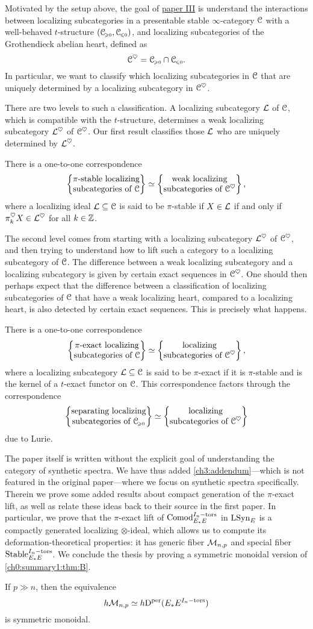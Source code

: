 Motivated by the setup above, the goal of \hyperref[ch3]{paper III} is understand the interactions between localizing subcategories in a presentable stable $\infty$-category $\EuScript{C}$ with a well-behaved $t$-structure $(\EuScript{C}_{\hspace{-1pt}\scriptscriptstyle\geqslant 0}, \EuScript{C}_{\hspace{-1pt}\scriptscriptstyle\leqslant 0})$, and localizing subcategories of the Grothendieck abelian heart, defined as 
\[\EuScript{C}^\heartsuit = \EuScript{C}_{\hspace{-1pt}\scriptscriptstyle\geqslant 0}\cap \EuScript{C}_{\hspace{-1pt}\scriptscriptstyle\leqslant 0}.\] 
In particular, we want to classify which localizing subcategories in $\EuScript{C}$ that are uniquely determined by a localizing subcategory in $\EuScript{C}^\heartsuit$. 

There are two levels to such a classification. A localizing subcategory $\mathcal{L}$ of $\EuScript{C}$, which is compatible with the $t$-structure, determines a weak localizing subcategory $\mathcal{L}^\heartsuit$ of $\EuScript{C}^\heartsuit$. Our first result classifies those $\mathcal{L}$ who are uniquely determined by $\mathcal{L}^\heartsuit$. 

\begin{theorem}
    There is a one-to-one correspondence
    \[\left\{ \begin{matrix} \pi\text{-stable localizing}\\ \text{subcategories of }\EuScript{C} \end{matrix} \right\} \simeq \left\{ \begin{matrix} \text{weak localizing}\\ \text{subcategories of }\EuScript{C}^\heartsuit \end{matrix} \right\},\]
    where a localizing ideal $\mathcal{L}\subseteq \EuScript{C}$ is said to be $\pi$-stable if $X\in \mathcal{L}$ if and only if $\pi_k^\heartsuit X \in \mathcal{L}^\heartsuit$ for all $k\in \mathbb{Z}$.  
\end{theorem}

The second level comes from starting with a localizing subcategory $\mathcal{L}^\heartsuit$ of $\EuScript{C}^\heartsuit$, and then trying to understand how to lift such a category to a localizing subcategory of $\EuScript{C}$. The difference between a weak localizing subcategory and a localizing subcategory is given by certain exact sequences in $\EuScript{C}^\heartsuit$. One should then perhaps expect that the difference between a classification of localizing subcategories of $\EuScript{C}$ that have a weak localizing heart, compared to a localizing heart, is also detected by certain exact sequences. This is precisely what happens.

\begin{theorem}
    There is a one-to-one correspondence
    \[\left\{ \begin{matrix} \pi\text{-exact localizing}\\ \text{subcategories of }\EuScript{C} \end{matrix} \right\} \simeq \left\{ \begin{matrix} \text{localizing}\\ \text{subcategories of }\EuScript{C}^\heartsuit \end{matrix} \right\},\]
    where a localizing subcategory $\mathcal{L}\subseteq \EuScript{C}$ is said to be $\pi$-exact if it is $\pi$-stable and is the kernel of a $t$-exact functor on $\EuScript{C}$. This correspondence factors through the correspondence
    \[\left\{ \begin{matrix} \text{separating localizing}\\ \text{subcategories of }\EuScript{C}_{\hspace{-1pt}\scriptscriptstyle\geqslant 0} \end{matrix} \right\} \simeq \left\{ \begin{matrix} \text{localizing}\\ \text{subcategories of }\EuScript{C}^\heartsuit \end{matrix} \right\}\]
    due to Lurie. 
\end{theorem}

The paper itself is written without the explicit goal of understanding the category of synthetic spectra. We have thus added \cref{ch3:addendum}---which is not featured in the original paper---where we focus on synthetic spectra specifically. Therein we prove some added results about compact generation of the $\pi$-exact lift, as well as relate these ideas back to their source in the first paper. In particular, we prove that the $\pi$-exact lift of $\mathrm{Comod}_{E_*E}^{I_n-\mathrm{tors}}$ in $\mathrm{LSyn}_{E}$ is a compactly generated localizing $\otimes$-ideal, which allows us to compute its deformation-theoretical properties: it has generic fiber $\mathcal{M}_{n,p}$ and special fiber $\mathrm{Stable}_{E_*E}^{I_n-\mathrm{tors}}$. We conclude the thesis by proving a symmetric monoidal version of \cref{ch0:summary1:thm:B}. 

\begin{theorem}
    If $p\gg n$, then the equivalence
    \[h\mathcal{M}_{n,p} \simeq h \mathrm{D}^{\mathrm{per}}(E_*E^{I_n-\mathrm{tors}})\] 
    is symmetric monoidal. 
\end{theorem}
